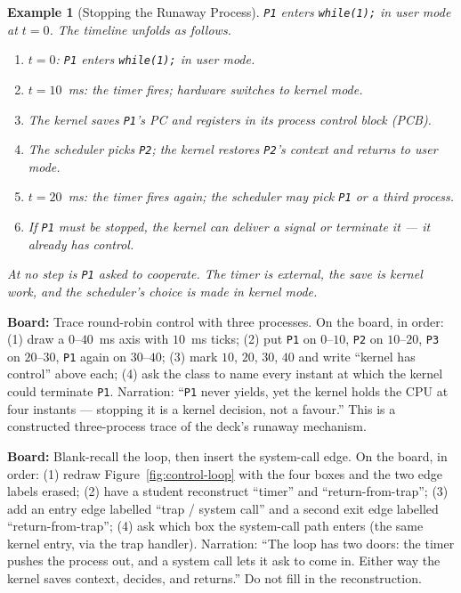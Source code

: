 \documentclass[11pt]{article}
\newtheorem{example}{Example}[section]
\begin{document}
\begin{example}[Stopping the Runaway Process]
\label{ex:runaway}
\texttt{P1} enters \texttt{while(1);} in user mode at $t=0$. The timeline unfolds as follows.
\begin{enumerate}
  \item $t=0$: \texttt{P1} enters \texttt{while(1);} in user mode.
  \item $t=10$~ms: the timer fires; hardware switches to kernel mode.
  \item The kernel saves \texttt{P1}'s PC and registers in its process control block (PCB).
  \item The scheduler picks \texttt{P2}; the kernel restores \texttt{P2}'s context and returns to user mode.
  \item $t=20$~ms: the timer fires again; the scheduler may pick \texttt{P1} or a third process.
  \item If \texttt{P1} must be stopped, the kernel can deliver a signal or terminate it --- it already has control.
\end{enumerate}
At no step is \texttt{P1} asked to cooperate. The timer is external, the save is kernel work, and the scheduler's choice is made in kernel mode.
\end{example}

\noindent\textbf{Board:} Trace round-robin control with three processes. On the board, in order: (1) draw a $0$--$40$~ms axis with $10$~ms ticks; (2) put \texttt{P1} on $0$--$10$, \texttt{P2} on $10$--$20$, \texttt{P3} on $20$--$30$, \texttt{P1} again on $30$--$40$; (3) mark $10$, $20$, $30$, $40$ and write ``kernel has control'' above each; (4) ask the class to name every instant at which the kernel could terminate \texttt{P1}. Narration: ``\texttt{P1} never yields, yet the kernel holds the CPU at four instants --- stopping it is a kernel decision, not a favour.'' This is a constructed three-process trace of the deck's runaway mechanism.

\noindent\textbf{Board:} Blank-recall the loop, then insert the system-call edge. On the board, in order: (1) redraw Figure~\ref{fig:control-loop} with the four boxes and the two edge labels erased; (2) have a student reconstruct ``timer'' and ``return-from-trap''; (3) add an entry edge labelled ``trap / system call'' and a second exit edge labelled ``return-from-trap''; (4) ask which box the system-call path enters (the same kernel entry, via the trap handler). Narration: ``The loop has two doors: the timer pushes the process out, and a system call lets it ask to come in. Either way the kernel saves context, decides, and returns.'' Do not fill in the reconstruction.
\end{document}
